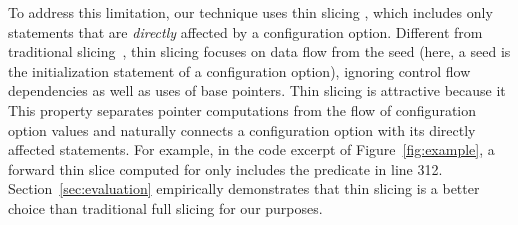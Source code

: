 

To address this limitation, our technique uses thin
slicing \cite{Sridharan:2007}, which includes
only statements that are \textit{directly} affected by a configuration option.
Different from traditional slicing~\cite{Horwitz:1988}, thin slicing
focuses on data flow from the seed (here, a
seed is the initialization statement of a configuration option), ignoring
control flow dependencies as well as uses of
base pointers. 
Thin slicing is attractive because it
This property separates
pointer computations from the flow of configuration option values and
naturally connects a configuration option with its
directly affected statements.
For example, in the code excerpt of
Figure~\ref{fig:example},
a forward thin slice computed for 
only includes the predicate in line 312.
Section~\ref{sec:evaluation} 
empirically demonstrates that thin slicing
is a better choice than traditional full slicing for our purposes.




% 

